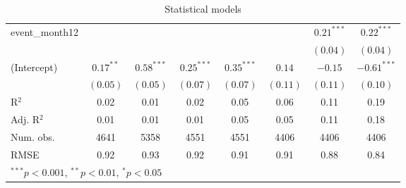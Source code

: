 \begin{table}
\begin{center}
\begin{tabular}{l c c c c c c c }
event\_month12     &              &              &              &              &              & $0.21^{***}$ & $0.22^{***}$  \\
                   &              &              &              &              &              & $(0.04)$     & $(0.04)$      \\
(Intercept)        & $0.17^{**}$  & $0.58^{***}$ & $0.25^{***}$ & $0.35^{***}$ & $0.14$       & $-0.15$      & $-0.61^{***}$ \\
                   & $(0.05)$     & $(0.05)$     & $(0.07)$     & $(0.07)$     & $(0.11)$     & $(0.11)$     & $(0.10)$      \\
\hline
R$^2$              & 0.02         & 0.01         & 0.02         & 0.05         & 0.06         & 0.11         & 0.19          \\
Adj. R$^2$         & 0.01         & 0.01         & 0.01         & 0.05         & 0.05         & 0.11         & 0.18          \\
Num. obs.          & 4641         & 5358         & 4551         & 4551         & 4406         & 4406         & 4406          \\
RMSE               & 0.92         & 0.93         & 0.92         & 0.91         & 0.91         & 0.88         & 0.84          \\
\hline
\multicolumn{8}{l}{\scriptsize{$^{***}p<0.001$, $^{**}p<0.01$, $^*p<0.05$}}
\end{tabular}
\caption{Statistical models}
\label{table:coefficients}
\end{center}
\end{table}
